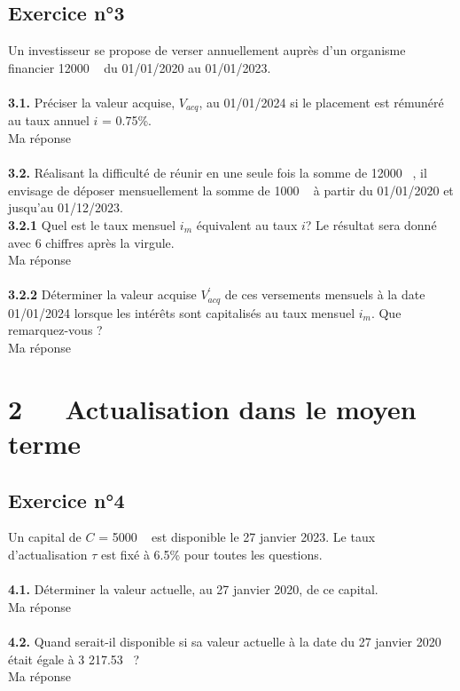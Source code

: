 \documentclass{article}
\begin{document}
\subsection{Exercice n°3}
\textcolor{exogris}{
Un investisseur se propose de verser annuellement auprès d’un organisme financier 12000 \texteuro  du 01/01/2020 au 01/01/2023.
}
\\\\ \textcolor{exogris}{\textbf{3.1.}
Préciser la valeur acquise, $V_{acq}$, au 01/01/2024 si le placement est rémunéré au taux annuel $i$ = 0.75\%.
}
\\%
Ma réponse
\\%
\\%
\textcolor{exogris}{\textbf{3.2.}
Réalisant la difficulté de réunir en une seule fois la somme de 12000 \texteuro , il envisage de déposer mensuellement la somme de 1000 \texteuro  à partir du 01/01/2020 et jusqu’au 01/12/2023.
}
\\%
\textcolor{exogris}{\textbf{3.2.1}
Quel est le taux mensuel $i_m$ équivalent au taux $i$? Le résultat sera donné avec 6 chiffres après la virgule.
}%
\\%
Ma réponse
\\%
\\%
\textcolor{exogris}{\textbf{3.2.2}
Déterminer la valeur acquise $V^{'}_{acq}$ de ces versements mensuels à la date 01/01/2024 lorsque les intérêts sont capitalisés au taux mensuel $i_m$. Que remarquez-vous ?
}%
\\%
Ma réponse




\section{2   Actualisation dans le moyen terme}
\subsection{Exercice n°4}
\textcolor{exogris}{
Un capital de $C$ = 5000 \texteuro  est disponible le 27 janvier 2023. Le taux d’actualisation $\tau$ est fixé à 6.5\% pour toutes les questions.
}
\\\\ \textcolor{exogris}{\textbf{4.1.}
Déterminer la valeur actuelle, au 27 janvier 2020, de ce capital.
}
\\%
Ma réponse
\\%
\\%
\textcolor{exogris}{\textbf{4.2.}
Quand serait-il disponible si sa valeur actuelle à la date du 27 janvier 2020 était égale à 3 217.53 \texteuro ?
}
\\%
Ma réponse
\end{document}
